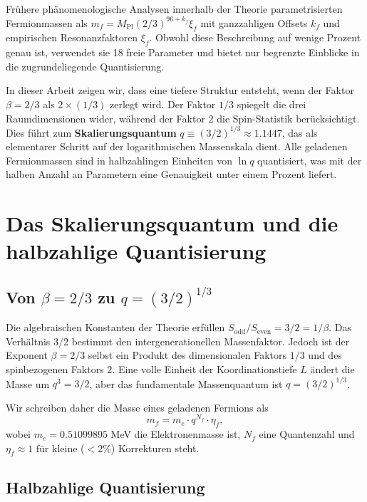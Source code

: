 \documentclass[12pt,a4paper]{article}
\begin{document}
	Frühere phänomenologische Analysen innerhalb der Theorie parametrisierten Fermionmassen als $m_f = M_{\mathrm{Pl}}(2/3)^{96+k_f}\xi_f$ mit ganzzahligen Offsets $k_f$ und empirischen Resonanzfaktoren $\xi_f$. Obwohl diese Beschreibung auf wenige Prozent genau ist, verwendet sie 18 freie Parameter und bietet nur begrenzte Einblicke in die zugrundeliegende Quantisierung.
	
	In dieser Arbeit zeigen wir, dass eine tiefere Struktur entsteht, wenn der Faktor $\beta = 2/3$ als $2 \times (1/3)$ zerlegt wird. Der Faktor $1/3$ spiegelt die drei Raumdimensionen wider, während der Faktor $2$ die Spin-Statistik berücksichtigt. Dies führt zum \textbf{Skalierungsquantum} $q \equiv (3/2)^{1/3} \approx 1.1447$, das als elementarer Schritt auf der logarithmischen Massenskala dient. Alle geladenen Fermionmassen sind in halbzahlingen Einheiten von $\ln q$ quantisiert, was mit der halben Anzahl an Parametern eine Genauigkeit unter einem Prozent liefert.
	
	\section{Das Skalierungsquantum und die halbzahlige Quantisierung}
	
	\subsection{Von $\beta = 2/3$ zu $q = (3/2)^{1/3}$}
	
	Die algebraischen Konstanten der Theorie erfüllen $S_{\mathrm{odd}}/S_{\mathrm{even}} = 3/2 = 1/\beta$. Das Verhältnis $3/2$ bestimmt den intergenerationellen Massenfaktor. Jedoch ist der Exponent $\beta = 2/3$ selbst ein Produkt des dimensionalen Faktors $1/3$ und des spinbezogenen Faktors $2$. Eine volle Einheit der Koordinationstiefe $L$ ändert die Masse um $q^3 = 3/2$, aber das fundamentale Massenquantum ist $q = (3/2)^{1/3}$.
	
	Wir schreiben daher die Masse eines geladenen Fermions als
	\begin{equation}
		m_f = m_e \cdot q^{N_f} \cdot \eta_f,
		\label{eq:quantized}
	\end{equation}
	wobei $m_e = 0.51099895$ MeV die Elektronenmasse ist, $N_f$ eine Quantenzahl und $\eta_f \approx 1$ für kleine ($<2\%$) Korrekturen steht.
	
	\subsection{Halbzahlige Quantisierung}
	
\end{document}
